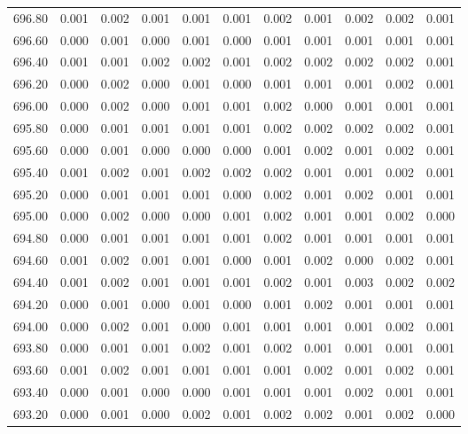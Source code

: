 \begin{longtable}{cccccccccc}
    696.80 &  0.001 &  0.002 &  0.001 &  0.001 &  0.001 &  0.002 &  0.001 &  0.002 &  0.002 &  0.001 \\
    696.60 &  0.000 &  0.001 &  0.000 &  0.001 &  0.000 &  0.001 &  0.001 &  0.001 &  0.001 &  0.001 \\
    696.40 &  0.001 &  0.001 &  0.002 &  0.002 &  0.001 &  0.002 &  0.002 &  0.002 &  0.002 &  0.001 \\
    696.20 &  0.000 &  0.002 &  0.000 &  0.001 &  0.000 &  0.001 &  0.001 &  0.001 &  0.002 &  0.001 \\
    696.00 &  0.000 &  0.002 &  0.000 &  0.001 &  0.001 &  0.002 &  0.000 &  0.001 &  0.001 &  0.001 \\
    695.80 &  0.000 &  0.001 &  0.001 &  0.001 &  0.001 &  0.002 &  0.002 &  0.002 &  0.002 &  0.001 \\
    695.60 &  0.000 &  0.001 &  0.000 &  0.000 &  0.000 &  0.001 &  0.002 &  0.001 &  0.002 &  0.001 \\
    695.40 &  0.001 &  0.002 &  0.001 &  0.002 &  0.002 &  0.002 &  0.001 &  0.001 &  0.002 &  0.001 \\
    695.20 &  0.000 &  0.001 &  0.001 &  0.001 &  0.000 &  0.002 &  0.001 &  0.002 &  0.001 &  0.001 \\
    695.00 &  0.000 &  0.002 &  0.000 &  0.000 &  0.001 &  0.002 &  0.001 &  0.001 &  0.002 &  0.000 \\
    694.80 &  0.000 &  0.001 &  0.001 &  0.001 &  0.001 &  0.002 &  0.001 &  0.001 &  0.001 &  0.001 \\
    694.60 &  0.001 &  0.002 &  0.001 &  0.001 &  0.000 &  0.001 &  0.002 &  0.000 &  0.002 &  0.001 \\
    694.40 &  0.001 &  0.002 &  0.001 &  0.001 &  0.001 &  0.002 &  0.001 &  0.003 &  0.002 &  0.002 \\
    694.20 &  0.000 &  0.001 &  0.000 &  0.001 &  0.000 &  0.001 &  0.002 &  0.001 &  0.001 &  0.001 \\
    694.00 &  0.000 &  0.002 &  0.001 &  0.000 &  0.001 &  0.001 &  0.001 &  0.001 &  0.002 &  0.001 \\
    693.80 &  0.000 &  0.001 &  0.001 &  0.002 &  0.001 &  0.002 &  0.001 &  0.001 &  0.001 &  0.001 \\
    693.60 &  0.001 &  0.002 &  0.001 &  0.001 &  0.001 &  0.001 &  0.002 &  0.001 &  0.002 &  0.001 \\
    693.40 &  0.000 &  0.001 &  0.000 &  0.000 &  0.001 &  0.001 &  0.001 &  0.002 &  0.001 &  0.001 \\
    693.20 &  0.000 &  0.001 &  0.000 &  0.002 &  0.001 &  0.002 &  0.002 &  0.001 &  0.002 &  0.000 \\

\end{longtable}
